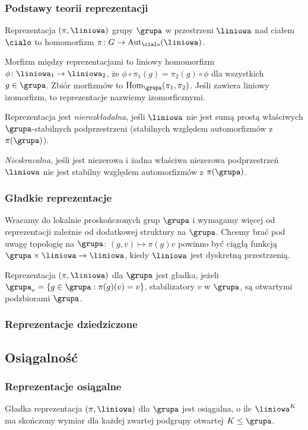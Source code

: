 \subsubsection{Podstawy teorii reprezentacji}
\begin{definicja}
	Reprezentacja $(\pi, \liniowa)$ grupy $\grupa$ w przestrzeni $\liniowa$ nad ciałem $\cialo$ to homomorfizm $\pi \colon G \to \textrm{Aut}_{\cialo}(\liniowa)$.
\end{definicja}

Morfizm między reprezentacjami to liniowy homomorfizm $\phi \colon \liniowa_1 \to \liniowa_2$, że $\phi \circ \pi_1(g) = \pi_2(g) \circ \phi$ dla wszystkich $g \in \grupa$.
Zbiór morfizmów to $\textrm{Hom}_\grupa(\pi_1, \pi_2)$.
Jeśli zawiera liniowy izomorfizm, to reprezentacje nazwiemy izomorficznymi.

Reprezentacja jest \emph{nierozkładalna}, jeśli $\liniowa$ nie jest sumą prostą właściwych $\grupa$-stabilnych podprzestrzeni (stabilnych względem automorfizmów z $\pi(\grupa)$).

\emph{Nieskracalna}, jeśli jest niezerowa i żadna właściwa niezerowa podprzestrzeń $\liniowa$ nie jest stabilny względem automorfizmów z $\pi(\grupa)$.

\subsubsection{Gładkie reprezentacje}
Wracamy do lokalnie proskończonych grup $\grupa$ i wymagamy więcej od reprezentacji zależnie od dodatkowej struktury na $\grupa$.
Chcemy brać pod uwagę topologię na $\grupa$: $(g, v) \mapsto \pi(g) v$ powinno być ciągłą funkcją $\grupa \times \liniowa \to \liniowa$, kiedy $\liniowa$ jest dyskretną przestrzenią.

\begin{definicja}
	Reprezentacja $(\pi, \liniowa)$ dla $\grupa$ jest gładka, jeżeli $\grupa_v = \{g \in \grupa : \pi(g)(v) = v\}$, stabilizatory $v$ w $\grupa$, są otwartymi podzbiorami $\grupa$.
\end{definicja}

\subsubsection{Reprezentacje dziedziczone}

\subsection{Osiągalność}
\subsubsection{Reprezentacje osiągalne}
\begin{definicja}
	Gładka reprezentacja $(\pi, \liniowa)$ dla $\grupa$ jest {osiągalna}, o ile $\liniowa^K$ ma skończony wymiar dla każdej zwartej podgrupy otwartej $K \le \grupa$.
\end{definicja}

